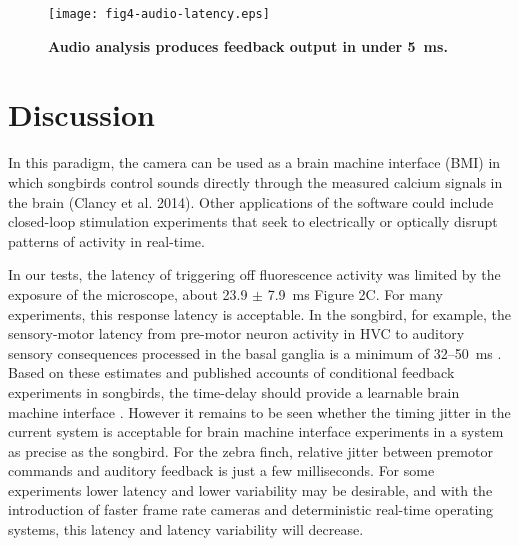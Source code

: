 \begin{figure}
\texttt{[image: fig4-audio-latency.eps]}
\caption[Latency for audio processing]{\textbf{Audio analysis 
produces feedback output in under 5~ms.} 
}
\label{fig:audio-latency}
\end{figure}

\section{Discussion}


 In this paradigm, the camera can be used as a brain machine interface
 (BMI) in which songbirds control sounds directly through the measured
 calcium signals in the brain (Clancy et al. 2014). Other applications
 of the software could include closed-loop stimulation experiments 
that seek to electrically or optically disrupt patterns of activity in
 real-time.

In our tests, the latency of triggering off fluorescence activity was 
limited by the exposure of the microscope, about 23.9 $\pm$ 7.9~ms 
Figure 2C. For many experiments, this response latency is acceptable. 
In the songbird, for example, the sensory-motor latency from pre-motor
 neuron activity in HVC to auditory sensory consequences processed in 
the basal ganglia is a minimum of 32--50~ms \cite{Andalman:2009bh}. 
Based on these estimates and published accounts of conditional 
feedback experiments in songbirds, the time-delay should provide a 
learnable brain machine interface 
\cite{Olveczky:2005bp,Tumer:2007bi,Sakata:2008cm,Sober:2009ci}. 
However it remains to be seen whether the timing jitter in the current
 system is acceptable for brain machine interface experiments in a 
system as precise as the songbird. For the zebra finch, relative 
jitter between premotor commands and auditory feedback is just a few 
milliseconds. For some experiments lower latency and lower variability
 may be desirable, and with the introduction of faster frame rate 
cameras and deterministic real-time operating systems, this latency 
and latency variability will decrease.
